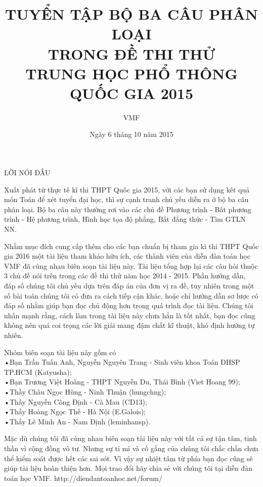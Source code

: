 \documentclass[12pt,twoside]{article}
\title{TUYỂN TẬP BỘ BA CÂU PHÂN LOẠI\\ TRONG ĐỀ THI THỬ \\ TRUNG HỌC PHỔ THÔNG QUỐC GIA 2015}
\author{VMF}
\date{Ngày 6 tháng 10 năm 2015}
\begin{document}

\newpage
\thispagestyle{empty}
\text{ }

\newpage
\maketitle
\thispagestyle{empty}
{\Large LỜI NÓI ĐẦU}

\hspace{10mm} Xuất phát từ thực tế kì thi THPT Quốc gia 2015, với các bạn sử dụng kết quả môn Toán để xét tuyển đại học, thì sự cạnh tranh chủ yếu diễn ra ở bộ ba câu phân loại. Bộ ba câu này thường rơi vào các chủ đề Phương trình - Bất phương trình - Hệ phương trình, Hình học tọa độ phẳng, Bất đẳng thức - Tìm GTLN NN.
\vspace{5mm}
 
\hspace{10mm} Nhằm mục đích cung cấp thêm cho các bạn chuẩn bị tham gia kì thi THPT Quốc gia 2016 một tài liệu tham khảo hữu ích, các thành viên của diễn đàn toán học VMF đã cùng nhau biên soạn tài liệu này. Tài liệu tổng hợp lại các câu hỏi thuộc 3 chủ đề nói trên trong các đề thi thử năm học 2014 - 2015. Phần hướng dẫn, đáp số chúng tôi chủ yếu dựa trên đáp án của đơn vị ra đề, tuy nhiên trong một số bài toán chúng tôi có đưa ra cách tiếp cận khác, hoặc chỉ hướng dẫn sơ lược có đáp số nhằm giúp bạn đọc chủ động hơn trong quá trình đọc tài liệu. Chúng tôi nhấn mạnh rằng, cách làm trong tài liệu này chưa hẳn là tốt nhất, bạn đọc cũng không nên quá coi trọng các lời giải mang đậm chất kĩ thuật, khó định hướng tự nhiên.
\vspace{5mm}
 

\hspace{10mm} Nhóm biên soạn tài liệu này gồm có\\
•Bạn Trần Tuấn Anh, Nguyễn Nguyên Trang - Sinh viên khoa Toán ĐHSP TP.HCM (Katyusha);\\
•Bạn Trương Việt Hoàng - THPT Nguyễn Du, Thái Bình (Viet Hoang 99);\\
•Thầy Châu Ngọc Hùng - Ninh Thuận (hungchng);\\
•Thầy Nguyễn Công Định - Cà Mau (CD13);\\
•Thầy Hoàng Ngọc Thế - Hà Nội (E.Galois);\\
•Thầy Lê Minh An - Nam Định (leminhansp).
\vspace{5mm}

\hspace{10mm} Mặc dù chúng tôi đã cùng nhau biên soạn tài liệu này với tất cả sự tận tâm, tinh thần vì cộng đồng vô tư. Nhưng sự tỉ mỉ và cố gắng của chúng tôi chắc chắn chưa thể kiểm soát được hết các sai sót. Vì vậy sự nhiệt tâm từ phía bạn đọc cũng sẽ giúp tài liệu hoàn thiện hơn. Mọi trao đổi hãy chia sẻ với chúng tôi tại diễn đàn toán học VMF.
http://diendantoanhoc.net/forum/
\vspace{5mm}
\end{document}
